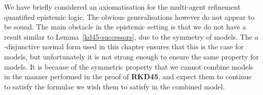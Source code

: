 We have briefly considered an axiomatisation for the multi-agent refinement
quantified epistemic logic. The obvious generalisations however do not appear to
be sound. The main obstacle in the epistemic setting is that we do not have a
result similar to Lemma~\ref{kd45-successors}, due to the symmetry of \classS{}
models. The $a$-disjunctive normal form used in this chapter ensures that this
is the case for \classKD{} models, but unfortunately it is not strong enough to
ensure the same property for \classS{} models. It is because of the symmetric
property that we cannot combine \classS{} models in the manner performed in the
proof of {\bf RKD45}, and expect them to continue to satisfy the formulae we
wish them to satisfy in the combined model.

